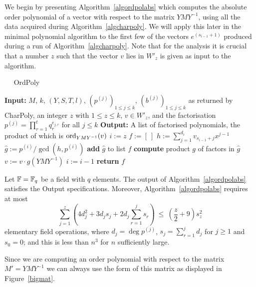 We begin by presenting Algorithm~\ref{algordpolabs} which computes the
absolute order polynomial of a vector with respect to the matrix $YMY^{-1}$,
using all the data acquired during Algorithm~\ref{algcharpoly}. 
We will apply this later
in the minimal polynomial algorithm to the first few of the vectors 
$e^{(s_{i-1}+1)}$ 
produced during a run of Algorithm~\ref{algcharpoly}. Note that for 
the analysis it is crucial that a number $z$ such that
the vector $v$ lies in $W'_z$ 
is given as input to the algorithm.

\begin{algorithm}
\caption{$\quad$ \sc OrdPoly}
\label{algordpolabs}
%
\begin{algorithmic}
\STATE \textbf{Input:} $M$, $k$, $(Y,S,T,l)$, $(p^{(j)})_{1 \le j \le k}$,
$(b^{(j)})_{1 \le j \le k}$ as returned by {\sc CharPoly}, an integer
$z$ with $1 \le z \le k$,
$v \in W'_z$, and the factorisation  
$p^{(j)} = \prod_{r=1}^t q_r^{e_{j,r}}$ for all $j\leq k$
\STATE \textbf{Output:} A list of factorised polynomials, the product
of which is $\mathrm{ord}_{YMY^{-1}}(v)$ 
\vspace*{2mm}
\STATE $i := z$ \hspace*{1cm} 
\STATE $f := [\ ]$ \hspace*{1cm} 
\REPEAT
    \STATE $h := \sum_{j=1}^{d_i} v_{s_{i-1}+j} x^{j-1}$
    \STATE $\hat g := p^{(i)}/\gcd(h,p^{(i)})$ \hspace*{1cm} 
        \STATE \textbf{add} $\hat g$ to list $f$
        \STATE \textbf{compute} product $g$ of factors in $\hat g$
            \STATE $v := v \cdot g(YMY^{-1})$ \hspace*{1cm} 
        \ENDIF
    \ENDIF
    \STATE $i := i - 1$
\STATE \textbf{return} $f$
\end{algorithmic}
\end{algorithm}

\begin{Prop}
\label{propordpol}
%
Let\/ $\mathbb{F} = \mathbb{F}_q$ be a field with $q$ elements.
The output of Algorithm~\ref{algordpolabs} satisfies the Output specifications.
Moreover, Algorithm~\ref{algordpolabs}
requires at most
\[
\sum_{j=1}^{z} 
  \left( 4 d_j^2  + 3d_j s_j + 2d_j \sum_{r=1}^j s_r \right)
\ \leq\ (\frac{z}{2}+9)s_z^2
\]
elementary field operations, 
where $d_j=\deg p^{(j)}$, $s_j=\sum_{r=1}^j d_j$ for $j\geq1$ and
$s_0=0$; and this is less than $n^3$ for $n$ sufficiently large.

\end{Prop}
\proofbeg
Since we are computing an order polynomial with respect to the matrix
$M' = YMY^{-1}$ we can always use the form of this matrix as displayed
in Figure~\ref{bigmat}.

